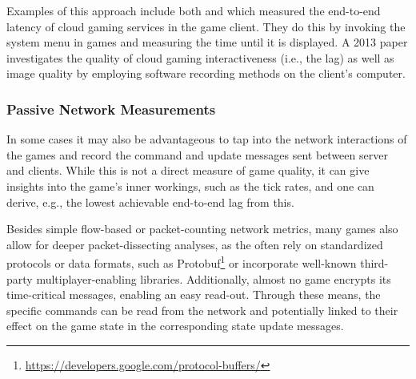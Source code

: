 Examples of this approach include both 
\cite{Chen:2011:MLC:2072298.2071991} and \cite{6670099} which measured 
the end-to-end latency of cloud gaming services in the game client. 
They do this by invoking the system menu in games and measuring the 
time until it is displayed. A 2013 paper \cite{6574660} investigates 
the quality of cloud gaming interactiveness (i.e., the lag) as well as 
image quality by employing software recording methods on the client's 
computer.


\subsubsection{Passive Network Measurements}

In some cases it may also be advantageous to tap into the network 
interactions of the games and record the command and update messages 
sent between server and clients. While this is not a direct measure of 
game quality, it can give insights into the game's inner workings, such 
as the tick rates, and one can derive, e.g., the lowest achievable 
end-to-end lag from this.


Besides simple flow-based or packet-counting network metrics, many 
games also allow for deeper packet-dissecting analyses, as the often 
rely on standardized protocols or data formats, such as 
Protobuf\footnote{\url{https://developers.google.com/protocol-buffers/}} 
or incorporate well-known third-party multiplayer-enabling libraries. 
Additionally, almost no game encrypts its time-critical messages, 
enabling an easy read-out. Through these means, the specific commands 
can be read from the network and potentially linked to their effect on 
the game state in the corresponding state update messages.



